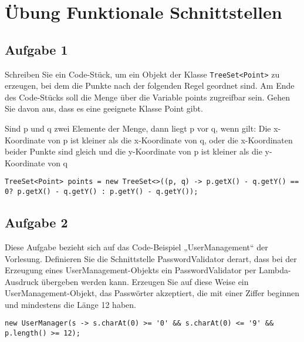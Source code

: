 \chapter{Übung Funktionale Schnittstellen}

\section{Aufgabe 1}
Schreiben Sie ein Code-Stück, um ein Objekt der Klasse
\lstinline{TreeSet<Point>} zu erzeugen, bei dem die Punkte nach der folgenden
Regel geordnet sind. Am Ende des Code-Stücks soll die Menge über die Variable
points zugreifbar sein. Gehen Sie davon aus, dass es eine geeignete Klasse
Point gibt.

Sind p und q zwei Elemente der Menge, dann liegt p vor q, wenn gilt: Die
x-Koordinate von p ist kleiner als die x-Koordinate von q, oder die
x-Koordinaten beider Punkte sind gleich und die y-Koordinate von p ist kleiner
als die y-Koordinate von q

\begin{lstlisting}
TreeSet<Point> points = new TreeSet<>((p, q) -> p.getX() - q.getY() == 0? p.getX() - q.getY() : p.getY() - q.getY());
\end{lstlisting}

\section{Aufgabe 2}
Diese Aufgabe bezieht sich auf das Code-Beispiel „UserManagement“ der
Vorlesung. Definieren Sie die Schnittstelle PasswordValidator derart, dass bei
der Erzeugung eines UserManagement-Objekts ein PasswordValidator per
Lambda-Ausdruck übergeben werden kann. Erzeugen Sie auf diese Weise ein
UserManagement-Objekt, das Passwörter akzeptiert, die mit einer Ziffer beginnen
und mindestens die Länge 12 haben.

\begin{lstlisting}
new UserManager(s -> s.charAt(0) >= '0' && s.charAt(0) <= '9' && p.length() >= 12);
\end{lstlisting}

